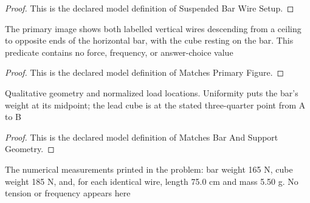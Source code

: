 \begin{proof}
  This is the declared model definition of Suspended Bar Wire Setup.
\end{proof}
\begin{definition}
  \label{def:physics:phyx-mini-0172:phyxminiproblems-problemphyxmini0172-matchesprimaryfigure}
  The primary image shows both labelled vertical wires descending from a ceiling to opposite ends of the horizontal bar, with the cube resting on the bar. This predicate contains no force, frequency, or answer-choice value
\end{definition}
\begin{proof}
  This is the declared model definition of Matches Primary Figure.
\end{proof}
\begin{definition}
  \label{def:physics:phyx-mini-0172:phyxminiproblems-problemphyxmini0172-matchesbarandsupportgeometry}
  Qualitative geometry and normalized load locations. Uniformity puts the bar's weight at its midpoint; the lead cube is at the stated three-quarter point from A to B
\end{definition}
\begin{proof}
  This is the declared model definition of Matches Bar And Support Geometry.
\end{proof}
\begin{definition}
  \label{def:physics:phyx-mini-0172:phyxminiproblems-problemphyxmini0172-matchesstatedmeasurements}
  The numerical measurements printed in the problem: bar weight 165 N, cube weight 185 N, and, for each identical wire, length 75.0 cm and mass 5.50 g. No tension or frequency appears here
\end{definition}
